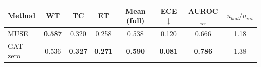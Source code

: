 \begin{tabular}{lccccccc}
\toprule
Method & WT & TC & ET & Mean (full) & ECE$\downarrow$ & AUROC$_{err}$ & $u_{bnd}/u_{int}$ \\
\midrule
MUSE & \textbf{0.587} & 0.320 & 0.258 & 0.538 & 0.120 & 0.666 & 1.18 \\
GAT-zero & 0.536 & \textbf{0.327} & \textbf{0.271} & \textbf{0.590} & \textbf{0.081} & \textbf{0.786} & 1.38 \\
\bottomrule
\end{tabular}